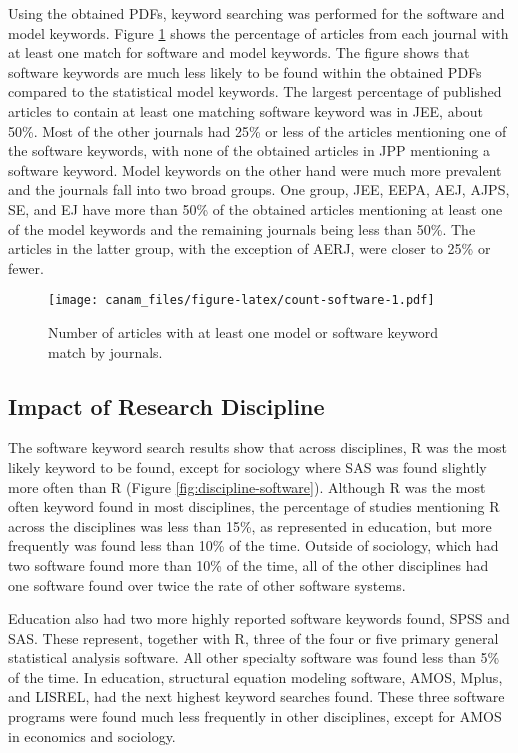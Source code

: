 \documentclass[
  english,
  ,man]{apa6}
\begin{document}
Using the obtained PDFs, keyword searching was performed for the software and model keywords. Figure \ref{fig:count-software} shows the percentage of articles from each journal with at least one match for software and model keywords. The figure shows that software keywords are much less likely to be found within the obtained PDFs compared to the statistical model keywords. The largest percentage of published articles to contain at least one matching software keyword was in JEE, about 50\%. Most of the other journals had 25\% or less of the articles mentioning one of the software keywords, with none of the obtained articles in JPP mentioning a software keyword. Model keywords on the other hand were much more prevalent and the journals fall into two broad groups. One group, JEE, EEPA, AEJ, AJPS, SE, and EJ have more than 50\% of the obtained articles mentioning at least one of the model keywords and the remaining journals being less than 50\%. The articles in the latter group, with the exception of AERJ, were closer to 25\% or fewer.

\begin{figure}
\centering
\texttt{[image: canam\_files/figure-latex/count-software-1.pdf]}
\caption{\label{fig:count-software}Number of articles with at least one model or software keyword match by journals.}
\end{figure}

\hypertarget{impact-of-research-discipline}{%
\subsection{Impact of Research Discipline}\label{impact-of-research-discipline}}

The software keyword search results show that across disciplines, R was the most likely keyword to be found, except for sociology where SAS was found slightly more often than R (Figure \ref{fig:discipline-software}). Although R was the most often keyword found in most disciplines, the percentage of studies mentioning R across the disciplines was less than 15\%, as represented in education, but more frequently was found less than 10\% of the time. Outside of sociology, which had two software found more than 10\% of the time, all of the other disciplines had one software found over twice the rate of other software systems.

Education also had two more highly reported software keywords found, SPSS and SAS. These represent, together with R, three of the four or five primary general statistical analysis software. All other specialty software was found less than 5\% of the time. In education, structural equation modeling software, AMOS, Mplus, and LISREL, had the next highest keyword searches found. These three software programs were found much less frequently in other disciplines, except for AMOS in economics and sociology.
\end{document}
